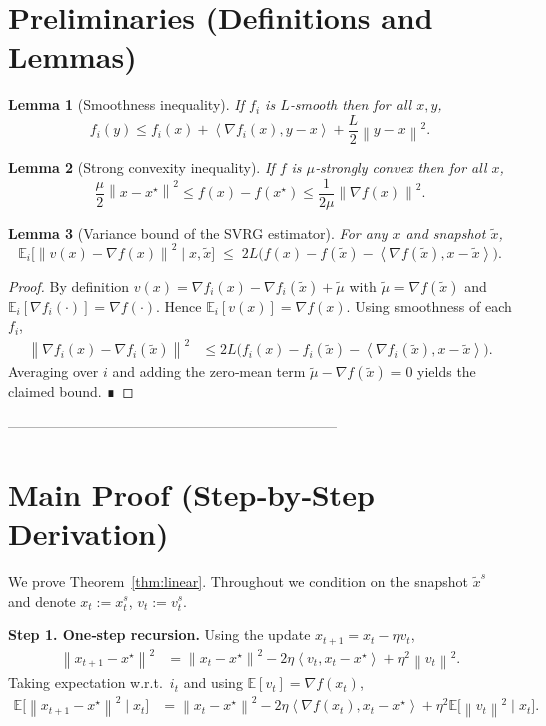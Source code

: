 \documentclass{article}
\newtheorem{lemma}{Lemma}
\newcommand{\E}{\mathbb{E}}
\newcommand{\norm}[1]{\left\|#1\right\|}
\newcommand{\inner}[2]{\left\langle #1,#2\right\rangle}
\newcommand{\grad}{\nabla}
\begin{document}
\section*{Preliminaries (Definitions and Lemmas)}
\begin{lemma}[Smoothness inequality]\label{lem:smooth}
If $f_i$ is $L$‑smooth then for all $x,y$,
\[
f_i(y)\le f_i(x)+\inner{\grad f_i(x)}{y-x}+\frac{L}{2}\norm{y-x}^{2}.
\]
\end{lemma}
\begin{lemma}[Strong convexity inequality]\label{lem:strong}
If $f$ is $\mu$‑strongly convex then for all $x$,
\[
\frac{\mu}{2}\norm{x-x^{\star}}^{2}\le f(x)-f(x^{\star})\le
\frac{1}{2\mu}\norm{\grad f(x)}^{2}.
\]
\end{lemma}
\begin{lemma}[Variance bound of the SVRG estimator]\label{lem:var}
For any $x$ and snapshot $\tilde{x}$,
\[
\E_{i}\!\bigl[\norm{v(x)-\grad f(x)}^{2}\mid x,\tilde{x}\bigr]
\;\le\; 2L\bigl(f(x)-f(\tilde{x})- \inner{\grad f(\tilde{x})}{x-\tilde{x}}\bigr).
\]
\end{lemma}
\begin{proof}
By definition $v(x)=\grad f_i(x)-\grad f_i(\tilde{x})+\tilde{\mu}$ with $\tilde{\mu}= \grad f(\tilde{x})$ and $\E_i[\grad f_i(\cdot)]=\grad f(\cdot)$.
Hence $\E_i[v(x)]=\grad f(x)$.  Using smoothness of each $f_i$,
\[
\begin{aligned}
\norm{\grad f_i(x)-\grad f_i(\tilde{x})}^{2}
&\le 2L\bigl(f_i(x)-f_i(\tilde{x})-\inner{\grad f_i(\tilde{x})}{x-\tilde{x}}\bigr).
\end{aligned}
\]
Averaging over $i$ and adding the zero‑mean term $\tilde{\mu}-\grad f(\tilde{x})=0$ yields the claimed bound. ∎
\end{proof}

-----------------------------------------------------------------------

\section*{Main Proof (Step‑by‑Step Derivation)}
We prove Theorem~\ref{thm:linear}.  Throughout we condition on the snapshot $\tilde{x}^{s}$ and denote $x_t:=x_{t}^{s}$, $v_t:=v_{t}^{s}$.

\bigskip
\noindent\textbf{Step 1. One‑step recursion.}  
Using the update $x_{t+1}=x_t-\eta v_t$,
\begin{align}
\norm{x_{t+1}-x^{\star}}^{2}
&=\norm{x_t-x^{\star}}^{2}-2\eta\inner{v_t}{x_t-x^{\star}}+\eta^{2}\norm{v_t}^{2}. \tag{Step 1}
\end{align}
Taking expectation w.r.t.\ $i_t$ and using $\E[v_t]=\grad f(x_t)$,
\begin{align}
\E\!\bigl[\norm{x_{t+1}-x^{\star}}^{2}\mid x_t\bigr]
&=\norm{x_t-x^{\star}}^{2}
-2\eta\inner{\grad f(x_t)}{x_t-x^{\star}}
+\eta^{2}\E\!\bigl[\norm{v_t}^{2}\mid x_t\bigr]. \tag{Step 2}
\end{align}
\end{document}
